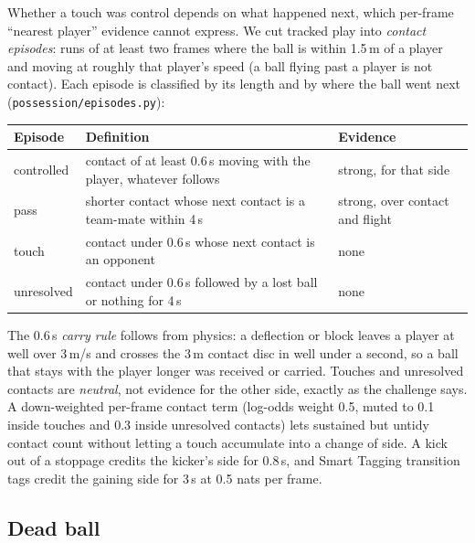 \documentclass[11pt,a4paper]{article}
\newcommand{\code}[1]{\texttt{#1}}
\newcommand{\st}[1]{\textbf{#1}}
\begin{document}
Whether a touch was control depends on what happened next, which per-frame ``nearest player''
evidence cannot express. We cut tracked play into \emph{contact episodes}: runs of at least two
frames where the ball is within 1.5\,m of a player and moving at roughly that player's speed (a
ball flying past a player is not contact). Each episode is classified by its length and by where
the ball went next (\code{possession/episodes.py}):

\begin{center}\small
\begin{tabularx}{\linewidth}{@{}l L l@{}}
\toprule
\st{Episode} & \st{Definition} & \st{Evidence} \\
\midrule
controlled & contact of at least 0.6\,s moving with the player, whatever follows & strong, for that side \\
pass & shorter contact whose next contact is a team-mate within 4\,s & strong, over contact and flight \\
touch & contact under 0.6\,s whose next contact is an opponent & none \\
unresolved & contact under 0.6\,s followed by a lost ball or nothing for 4\,s & none \\
\bottomrule
\end{tabularx}
\end{center}

The 0.6\,s \emph{carry rule} follows from physics: a deflection or block leaves a player at well
over 3\,m/s and crosses the 3\,m contact disc in well under a second, so a ball that stays with the
player longer was received or carried. Touches and unresolved contacts are \emph{neutral}, not
evidence for the other side, exactly as the challenge says. A down-weighted per-frame contact term
(log-odds weight 0.5, muted to 0.1 inside touches and 0.3 inside unresolved contacts) lets
sustained but untidy contact count without letting a touch accumulate into a change of side. A
kick out of a stoppage credits the kicker's side for 0.8\,s, and Smart Tagging transition tags
credit the gaining side for 3\,s at 0.5 nats per frame.

\subsection{Dead ball}
\end{document}
